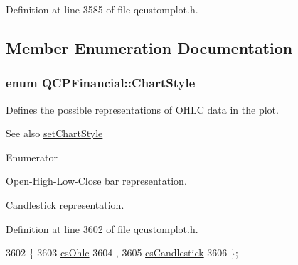 Definition at line 3585 of file qcustomplot.\+h.



\subsection{Member Enumeration Documentation}
\hypertarget{class_q_c_p_financial_a0f800e21ee98d646dfc6f8f89d10ebfb}{}
\subsubsection[{Chart\+Style}]{\setlength{\rightskip}{0pt plus 5cm}enum {\bf Q\+C\+P\+Financial\+::\+Chart\+Style}}\label{class_q_c_p_financial_a0f800e21ee98d646dfc6f8f89d10ebfb}
Defines the possible representations of O\+H\+L\+C data in the plot.

\begin{DoxySeeAlso}{See also}
\hyperlink{class_q_c_p_financial_a5a59175d36279d71596e64d7bb65596f}{set\+Chart\+Style} 
\end{DoxySeeAlso}
\begin{Desc}
\item[Enumerator]\par
\begin{description}
\item[{\em 
\hypertarget{class_q_c_p_financial_a0f800e21ee98d646dfc6f8f89d10ebfba3a516016c9298d3e95dd82aa203c4390}{}cs\+Ohlc\label{class_q_c_p_financial_a0f800e21ee98d646dfc6f8f89d10ebfba3a516016c9298d3e95dd82aa203c4390}
}]Open-\/\+High-\/\+Low-\/\+Close bar representation. \item[{\em 
\hypertarget{class_q_c_p_financial_a0f800e21ee98d646dfc6f8f89d10ebfbac803cbd39f26e3f206bcc7028679e62f}{}cs\+Candlestick\label{class_q_c_p_financial_a0f800e21ee98d646dfc6f8f89d10ebfbac803cbd39f26e3f206bcc7028679e62f}
}]Candlestick representation. \end{description}
\end{Desc}


Definition at line 3602 of file qcustomplot.\+h.


\begin{DoxyCode}
3602                   \{
3603     \hyperlink{class_q_c_p_financial_a0f800e21ee98d646dfc6f8f89d10ebfba3a516016c9298d3e95dd82aa203c4390}{csOhlc} 
3604     ,
3605     \hyperlink{class_q_c_p_financial_a0f800e21ee98d646dfc6f8f89d10ebfbac803cbd39f26e3f206bcc7028679e62f}{csCandlestick} 
3606   \};
\end{DoxyCode}


